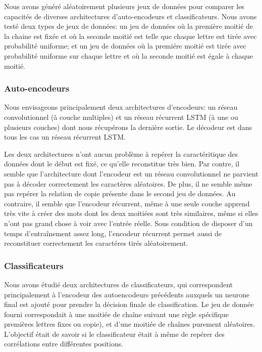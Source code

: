 \documentclass[a4paper, 11pt, onecolumn]{article}
\begin{document}
Nous avons généré aléatoirement plusieurs jeux de données pour comparer les
capacités de diverses architectures d'auto-encodeurs et classificateurs. Nous
avons testé deux types de jeux de données: un jeu de données où la première
moitié de la chaine est fixée et où la seconde moitié est telle que chaque
lettre est tirée avec probabilité uniforme; et un jeu de données où la premiére
moitié est tirée avec probabilité uniforme sur chaque lettre et où la seconde
moitié est égale à chaque moitié.

\subsubsection{Auto-encodeurs}

Nous envisageons principalement deux architectures d'encodeurs: un réseau
convolutionnel (à couche multiples) et un réseau récurrent LSTM (à une ou plusieurs
couches) dont nous récupérons la dernière sortie. Le décodeur est dans tous les
cas un réseau récurrent LSTM.

Les deux architectures n'ont aucun problème à repérer la caractéritique des données dont le
début est fixé, ce qu'elle reconstitue très bien. Par contre, il semble que l'architecture dont l'encodeur est un
réseau convolutionnel ne parvient pas à décoder correctement les caractères
aléatoires. De plus, il ne semble même pas repérer la relation de \og copie\fg
présente dans le second jeu de données. Au contraire, il semble que l'encodeur
récurrent, même à une seule couche apprend très vite à créer des mots dont les
deux moitiées sont très similaires, même si elles n'ont pas grand chose à voir
avec l'entrée réelle. Sous condition de disposer d'un temps d'entraînement assez
long, l'encodeur récurrent permet aussi de reconstituer correctement les
caractéres tirés aléatoirement.

\subsubsection{Classificateurs}

Nous avons étudié deux architectures de classificateurs, qui correspondent
principalement à l'encodeur des autoencodeurs précédents auxquels un neurone
final est ajouté pour prendre la décision finale de classification. Le jeu de
donnée fourni correspondait à une moitiée de chaîne suivant une règle spécifique
premières lettres fixes ou copie), et d'une moitiée de chaînes purement
aléatoires. L'objectif était de savoir si le classificateur était à même de
repérer des corrélations entre différentes positions.
\end{document}
